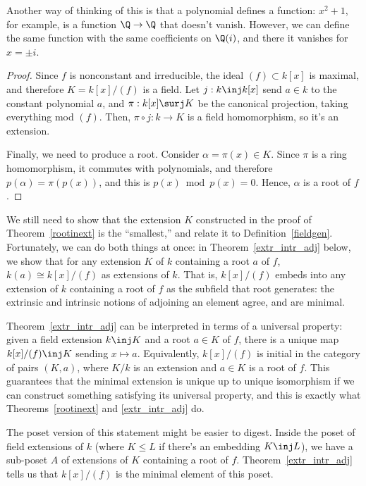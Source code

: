 Another way of thinking of this is that a polynomial defines a function: $x^2+1$, for example, is a function
$\Q\to\Q$ that doesn't vanish. However, we can define the same function with the same coefficients on $\Q(i)$, and
there it vanishes for $x = \pm i$.
\begin{proof}
Since $f$ is nonconstant and irreducible, the ideal $(f)\subset k[x]$ is maximal, and therefore $K = k[x]/(f)$ is a
field. Let $j:k\inj k[x]$ send $a\in k$ to the constant polynomial $a$, and $\pi:k[x]\surj K$ be the canonical
projection, taking everything mod $(f)$. Then, $\pi\circ j: k\to K$ is a field homomorphism, so it's an extension.

Finally, we need to produce a root. Consider $\alpha = \pi(x)\in K$. Since $\pi$ is a ring homomorphism, it
commutes with polynomials, and therefore $p(\alpha) = \pi(p(x))$, and this is $p(x)\bmod p(x) = 0$. Hence, $\alpha$
is a root of $f$.
\end{proof}
We still need to show that the extension $K$ constructed in the proof of Theorem~\ref{rootinext} is the
``smallest,'' and relate it to Definition~\ref{fieldgen}. Fortunately, we can do both things at once: in
Theorem~\ref{extr_intr_adj} below, we show that for any extension $K$ of $k$ containing a root $a$ of $f$,
$k(a)\cong k[x]/(f)$ as extensions of $k$. That is, $k[x]/(f)$ embeds into any extension of $k$ containing a root
of $f$ as the subfield that root generates: the extrinsic and intrinsic notions of adjoining an element agree, and
are minimal.
\begin{aside}
Theorem~\ref{extr_intr_adj} can be interpreted in terms of a universal property: given a field extension $k\inj K$
and a root $a\in K$ of $f$, there is a unique map $k[x]/(f)\inj K$ sending $x\mapsto a$. Equivalently, $k[x]/(f)$
is initial in the category of pairs $(K,a)$, where $K/k$ is an extension and $a\in K$ is a root of $f$. This
guarantees that the minimal extension is unique up to unique isomorphism if we can construct something satisfying
its universal property, and this is exactly what Theorems~\ref{rootinext} and \ref{extr_intr_adj} do.

The poset version of this statement might be easier to digest. Inside the poset of field extensions of $k$ (where
$K\le L$ if there's an embedding $K\inj L$), we have a sub-poset $A$ of extensions of $K$ containing a root of $f$.
Theorem~\ref{extr_intr_adj} tells us that $k[x]/(f)$ is the minimal element of this poset.
\end{aside}

